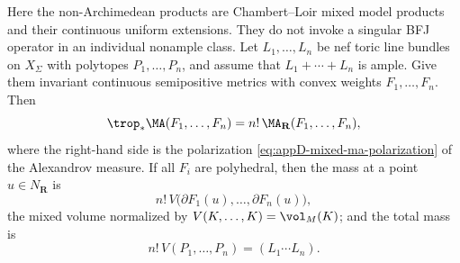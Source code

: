 \begin{proposition}
\label{prop:ch31-toric-mixed}
Here the non-Archimedean products are Chambert--Loir mixed model products
and their continuous uniform extensions.  They do not invoke a singular
BFJ operator in an individual nonample class.
Let $L_1,\ldots,L_n$ be nef toric line bundles on $X_\Sigma$ with
polytopes $P_1,\ldots,P_n$, and assume that
$L_1+\cdots+L_n$ is ample.  Give them invariant continuous semipositive
metrics with convex weights $F_1,\ldots,F_n$.  Then
\begin{equation}
\label{eq:ch31-toric-mixed-measure}
 \trop_*\MA(F_1,\ldots,F_n)=n!\,\MA_{\mathbf R}(F_1,\ldots,F_n),
\end{equation}
where the right-hand side is the polarization
\eqref{eq:appD-mixed-ma-polarization} of the Alexandrov measure.  If all
$F_i$ are polyhedral, then the mass at a point
$u\in N_{\mathbf R}$ is
\begin{equation}
\label{eq:ch31-toric-mixed-atom}
 n!\,V\bigl(\partial F_1(u),\ldots,\partial F_n(u)\bigr),
\end{equation}
the mixed volume normalized by $V(K,\ldots,K)=\vol_M(K)$; and the total
mass is
\begin{equation}
\label{eq:ch31-toric-mixed-mass}
 n!\,V(P_1,\ldots,P_n)=(L_1\cdots L_n).
\end{equation}
\end{proposition}

